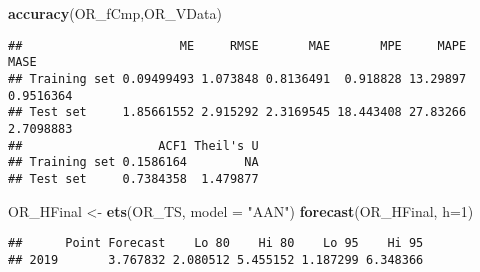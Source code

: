\documentclass[
]{article}
\newenvironment{Shaded}{\begin{snugshade}}{\end{snugshade}}
\newcommand{\CommentTok}[1]{\textcolor[rgb]{0.56,0.35,0.01}{\textit{#1}}}
\newcommand{\DataTypeTok}[1]{\textcolor[rgb]{0.13,0.29,0.53}{#1}}
\newcommand{\DecValTok}[1]{\textcolor[rgb]{0.00,0.00,0.81}{#1}}
\newcommand{\KeywordTok}[1]{\textcolor[rgb]{0.13,0.29,0.53}{\textbf{#1}}}
\newcommand{\NormalTok}[1]{#1}
\newcommand{\OperatorTok}[1]{\textcolor[rgb]{0.81,0.36,0.00}{\textbf{#1}}}
\newcommand{\StringTok}[1]{\textcolor[rgb]{0.31,0.60,0.02}{#1}}
\begin{document}
\begin{Shaded}
\begin{Highlighting}[]
\KeywordTok{accuracy}\NormalTok{(OR_fCmp,OR_VData)}
\end{Highlighting}
\end{Shaded}

\begin{verbatim}
##                      ME     RMSE       MAE       MPE     MAPE      MASE
## Training set 0.09499493 1.073848 0.8136491  0.918828 13.29897 0.9516364
## Test set     1.85661552 2.915292 2.3169545 18.443408 27.83266 2.7098883
##                   ACF1 Theil's U
## Training set 0.1586164        NA
## Test set     0.7384358  1.479877
\end{verbatim}

\begin{Shaded}
\begin{Highlighting}[]
\NormalTok{OR_HFinal <-}\StringTok{ }\KeywordTok{ets}\NormalTok{(OR_TS, }\DataTypeTok{model =} \StringTok{"AAN"}\NormalTok{)}
\KeywordTok{forecast}\NormalTok{(OR_HFinal, }\DataTypeTok{h=}\DecValTok{1}\NormalTok{)}
\end{Highlighting}
\end{Shaded}

\begin{verbatim}
##      Point Forecast    Lo 80    Hi 80    Lo 95    Hi 95
## 2019       3.767832 2.080512 5.455152 1.187299 6.348366
\end{verbatim}

\begin{Shaded}
\end{Shaded}
\end{document}
